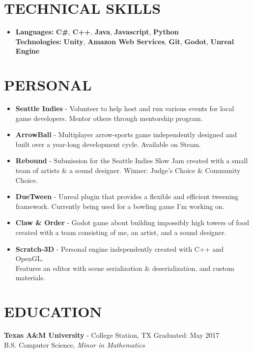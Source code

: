\documentclass[resmargin,10pt]{res} %
\begin{document}
\begin{resume}
    \section{TECHNICAL SKILLS}
    \begin{itemize}
        \setlength\itemsep{-0.0em}
        \item[]
              \textbf{\large Languages:} \textbf{C\#}, \textbf{C++}, \textbf{Java}, \textbf{Javascript}, \textbf{Python}\\
              \textbf{\large Technologies:} \textbf{Unity}, \textbf{Amazon Web Services}, \textbf{Git}, \textbf{Godot}, \textbf{Unreal Engine}
    \end{itemize}
    \section{PERSONAL}
    \begin{itemize}
        \setlength\itemsep{-0.0em}
        \item \textbf{Seattle Indies} - Volunteer to help host and run various events for local game developers. Mentor others through mentorship program.
        \item \textbf{ArrowBall} - Multiplayer arrow-sports game independently designed and built over a year-long development cycle. Available on Steam.
        \item \textbf{Rebound} - Submission for the Seattle Indies Slow Jam created with a small team of artists \& a sound designer. Winner: Judge's Choice \& Community Choice.
        \item \textbf{DueTween} - Unreal plugin that provides a flexible and efficient tweening framework. Currently being used for a bowling game I'm working on.
        \item \textbf{Claw \& Order} - Godot game about building impossibly high towers of food created with a team consisting of me, an artist, and a sound designer.
        \item \textbf{Scratch-3D} - Personal engine independently created with C++ and OpenGL. \\Features an editor with scene serialization \& deserialization, and custom materials.
    \end{itemize}

    \section{EDUCATION}
     {\bf Texas A\&M University} - College Station, TX \hfill
    Graduated: May 2017 \\
    B.S. Computer Science,
    \textit{Minor in Mathematics}
\end{resume}
\end{document}
